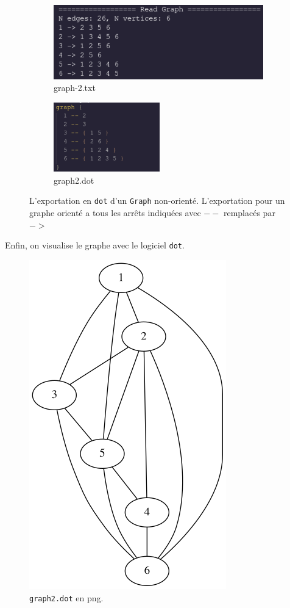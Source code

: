 \documentclass[10pt]{article} %
\begin{document}
\begin{figure}[h!]
    \centering
    \begin{subfigure}{0.45\textwidth}
        \centering
        \includegraphics[width=\textwidth]{media/readGraph2.png}
        \caption{graph-2.txt}
    \end{subfigure}
    \hspace{1.25cm}
    \hfill
    \begin{subfigure}{0.45\textwidth}
        \centering
        \includegraphics[height=3cm]{media/graph2_dot.png}
        \caption{graph2.dot}
    \end{subfigure}
    \caption{L'exportation en \texttt{dot} d'un \texttt{Graph} non-orienté. L'exportation pour un graphe orienté a tous les arrêts indiquées avec \texttt{$--$} remplacés par \texttt{$->$}}
    \label{Fig:cmp}

\end{figure}

Enfin, on visualise le graphe avec le logiciel \texttt{dot}.

\begin{figure}[h!]
    \centering
    \includegraphics[width=.2\textwidth]{media/graph2.png}
    \caption{\texttt{graph2.dot} en png.}
    \label{Fig:myfig}

\end{figure}
\end{document}
